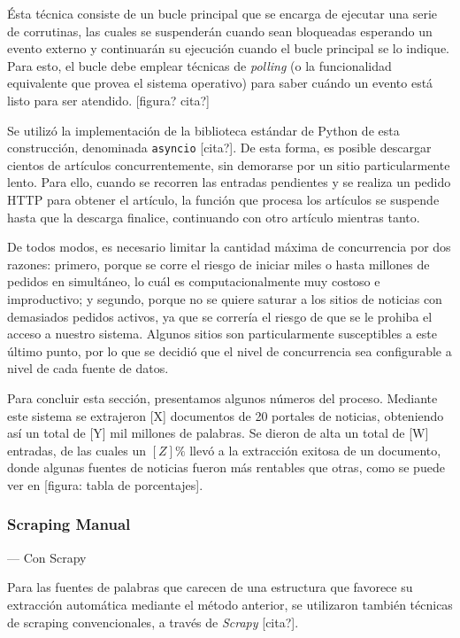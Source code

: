 Ésta técnica consiste de un bucle principal que se encarga de ejecutar una serie de corrutinas, las
cuales se suspenderán cuando sean bloqueadas esperando un evento externo y continuarán su ejecución
cuando el bucle principal se lo indique. Para esto, el bucle debe emplear técnicas de
\textit{polling} (o la funcionalidad equivalente que provea el sistema operativo) para saber cuándo
un evento está listo para ser atendido. [figura? cita?]

Se utilizó la implementación de la biblioteca estándar de Python de esta construcción, denominada
\texttt{asyncio} [cita?]. De esta forma, es posible descargar cientos de artículos concurrentemente,
sin demorarse por un sitio particularmente lento. Para ello, cuando se recorren las entradas
pendientes y se realiza un pedido HTTP para obtener el artículo, la función que procesa los
artículos se suspende hasta que la descarga finalice, continuando con otro artículo mientras tanto.

De todos modos, es necesario limitar la cantidad máxima de concurrencia por dos razones: primero,
porque se corre el riesgo de iniciar miles o hasta millones de pedidos en simultáneo, lo cuál es
computacionalmente muy costoso e improductivo; y segundo, porque no se quiere saturar a los sitios
de noticias con demasiados pedidos activos, ya que se correría el riesgo de que se le prohiba el
acceso a nuestro sistema. Algunos sitios son particularmente susceptibles a este último punto, por
lo que se decidió que el nivel de concurrencia sea configurable a nivel de cada fuente de datos.


Para concluir esta sección, presentamos algunos números del proceso. Mediante este sistema se
extrajeron [X] documentos de 20 portales de noticias, obteniendo así un total de [Y] mil millones de
palabras. Se dieron de alta un total de [W] entradas, de las cuales un $[Z]\%$ llevó a la extracción
exitosa de un documento, donde algunas fuentes de noticias fueron más rentables que otras, como se
puede ver en [figura: tabla de porcentajes].


\subsubsection{Scraping Manual}


--- Con Scrapy

Para las fuentes de palabras que carecen de una estructura que favorece su extracción automática
mediante el método anterior, se utilizaron también técnicas de scraping convencionales, a través de
\textit{Scrapy} [cita?].

